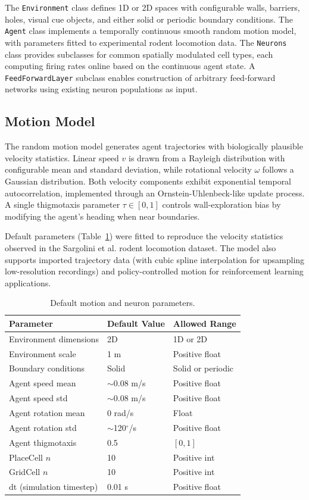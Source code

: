 \documentclass[12pt]{article}
\begin{document}
The \texttt{Environment} class defines 1D or 2D spaces with configurable walls, barriers, holes, visual cue objects, and either solid or periodic boundary conditions. The \texttt{Agent} class implements a temporally continuous smooth random motion model, with parameters fitted to experimental rodent locomotion data. The \texttt{Neurons} class provides subclasses for common spatially modulated cell types, each computing firing rates online based on the continuous agent state. A \texttt{FeedForwardLayer} subclass enables construction of arbitrary feed-forward networks using existing neuron populations as input.

\subsection{Motion Model}

The random motion model generates agent trajectories with biologically plausible velocity statistics. Linear speed $v$ is drawn from a Rayleigh distribution with configurable mean and standard deviation, while rotational velocity $\omega$ follows a Gaussian distribution. Both velocity components exhibit exponential temporal autocorrelation, implemented through an Ornstein-Uhlenbeck-like update process. A single thigmotaxis parameter $\tau \in [0, 1]$ controls wall-exploration bias by modifying the agent's heading when near boundaries.

Default parameters (Table~\ref{tab:defaults}) were fitted to reproduce the velocity statistics observed in the Sargolini et al. \citep{sargolini2006conjunctive} rodent locomotion dataset. The model also supports imported trajectory data (with cubic spline interpolation for upsampling low-resolution recordings) and policy-controlled motion for reinforcement learning applications.

\begin{table}[htbp]
\centering
\caption{Default motion and neuron parameters.}
\label{tab:defaults}
\begin{tabular}{lll}
\toprule
Parameter & Default Value & Allowed Range \\
\midrule
Environment dimensions & 2D & 1D or 2D \\
Environment scale & 1 m & Positive float \\
Boundary conditions & Solid & Solid or periodic \\
Agent speed mean & $\sim$0.08 m/s & Positive float \\
Agent speed std & $\sim$0.08 m/s & Positive float \\
Agent rotation mean & 0 rad/s & Float \\
Agent rotation std & $\sim$120$^{\circ}$/s & Positive float \\
Agent thigmotaxis & 0.5 & $[0, 1]$ \\
PlaceCell $n$ & 10 & Positive int \\
GridCell $n$ & 10 & Positive int \\
dt (simulation timestep) & 0.01 s & Positive float \\
\bottomrule
\end{tabular}
\end{table}
\end{document}
